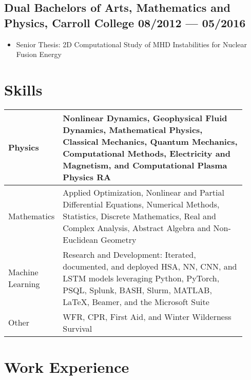 \documentclass[letterpaper,11pt]{article}
\begin{document}
\subsection*{{\color{cvblue}Dual Bachelors of Arts, Mathematics and Physics,} {Carroll College} \hfill 08/2012 --- 05/2016} 
\begin{itemize}
    \setlength{\itemsep}{-.5pt}
    \item Senior Thesis: 2D Computational Study of MHD Instabilities for Nuclear Fusion Energy
\end{itemize}



\section*{\color{cvblue}Skills}
\vspace{-.25in}
\begin{table}[h!]
    \setlength{\tabcolsep}{8pt}
    \renewcommand{\arraystretch}{2}
    \centering
    \begin{tabular}{p{0.12\linewidth} || p{0.8\linewidth}}
        Physics& Nonlinear Dynamics, Geophysical Fluid Dynamics, Mathematical Physics, Classical Mechanics,
        Quantum Mechanics, Computational Methods, Electricity and Magnetism, and Computational Plasma Physics RA \\\hline
        Mathematics& Applied Optimization, Nonlinear and Partial Differential Equations, Numerical Methods, Statistics, Discrete Mathematics, Real and Complex Analysis, Abstract Algebra and Non-Euclidean Geometry \\\hline
        Machine Learning & Research and Development: Iterated, documented, and deployed HSA, NN, CNN, and LSTM models leveraging Python, PyTorch, PSQL, Splunk, BASH, Slurm, MATLAB, \LaTeX,  Beamer, and the Microsoft Suite \\\hline
        Other& WFR, CPR, First Aid, and Winter Wilderness Survival\\\hline
    \end{tabular}
\end{table}



\section*{\color{cvblue}Work Experience } 
\end{document}
